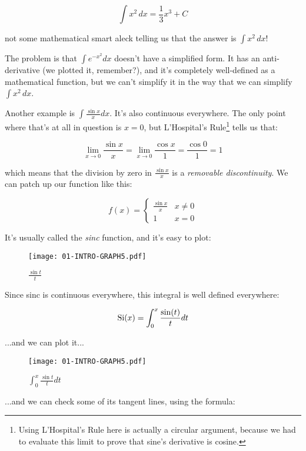 $$\int x^2\,dx = \frac{1}{3} x^3 + C$$

not some mathematical smart aleck telling us that the answer is $\int x^2\,dx$!

The problem is that $\int e^{-x^2} dx$ doesn't have a simplified form.  It has an anti-derivative
(we plotted it, remember?), and it's completely well-defined as a mathematical function, but we
can't simplify it in the way that we can simplify $\int x^2\,dx$.

Another example is $\int \frac{\sin x}{x} dx$.  It's also continuous everywhere.  The only point
where that's at all in question is $x=0$, but L'Hospital's Rule\footnote{Using L'Hospital's Rule here is actually
a circular argument, because we had to evaluate this limit to prove that sine's derivative is cosine.} tells us that:

$$\lim_{x\to 0} \frac{\sin x}{x} = \lim_{x\to 0} \frac{\cos x}{1} = \frac{\cos 0}{1} = 1$$

which means that the division by zero in $\frac{\sin x}{x}$ is a {\it removable discontinuity}.
We can patch up our function like this:

\[ f(x) = \begin{cases} 
      \frac{\sin x}{x} & x \ne 0 \\
      1 & x = 0
   \end{cases}
\]

It's usually called the {\it sinc} function, and it's easy to plot:

\begin{figure}[H]
\begin{center}
\texttt{[image: 01-INTRO-GRAPH5.pdf]}
\end{center}
\caption{$\frac{\sin t}{t}$}
\end{figure}

Since sinc is continuous everywhere, this integral is well defined everywhere:

$${\rm Si}(x) = \int_0^x \frac{\sin(t)}{t} dt$$

...and we can plot it...

\begin{figure}[H]
\begin{center}
\texttt{[image: 01-INTRO-GRAPH5.pdf]}
\end{center}
\caption{$\int_0^x \frac{\sin t}{t} dt$}
\end{figure}

...and we can check some of its tangent lines, using the formula:

